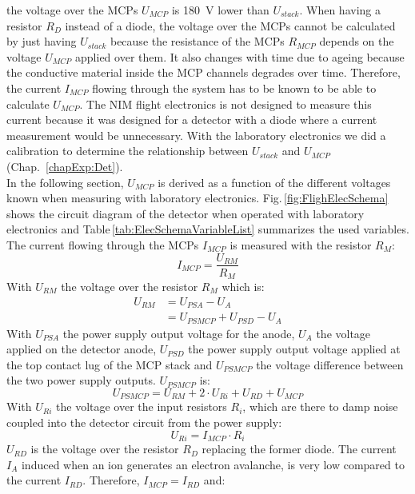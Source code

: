 the voltage over the MCPs $U_{MCP}$ is 180~V lower than $U_{stack}$. When having a resistor $R_D$ instead of a diode, the voltage over the MCPs cannot be calculated by just having $U_{stack}$ because the resistance of the MCPs $R_{MCP}$ depends on the voltage $U_{MCP}$ applied over them. It also changes with time due to ageing because the conductive material inside the MCP channels degrades over time. Therefore, the current $I_{MCP}$ flowing through the system has to be known to be able to calculate $U_{MCP}$. The NIM flight electronics is not designed to measure this current because it was designed for a detector with a diode where a current measurement would be unnecessary. With the laboratory electronics we did a calibration to determine the relationship between $U_{stack}$ and $U_{MCP}$ (Chap.~\ref{chapExp:Det}).\\
		In the following section, $U_{MCP}$ is derived as a function of the different voltages known when measuring with laboratory electronics. Fig.\,\ref{fig:FlighElecSchema} shows the circuit diagram of the detector when operated with laboratory electronics and Table\,\ref{tab:ElecSchemaVariableList} summarizes the used variables. The current flowing through the MCPs $I_{MCP}$ is measured with the resistor $R_M$:
		\begin{equation}
			I_{MCP} = \frac{U_{RM}}{R_{M}}
		\end{equation}
		With $U_{RM}$ the voltage over the resistor $R_{M}$ which is:
		\begin{align}
			U_{RM} &= U_{PSA} - U_{A}\\
				   &= U_{PSMCP} + U_{PSD} - U_A
		\end{align}
		With $U_{PSA}$ the power supply output voltage for the anode, $U_{A}$ the voltage applied on the detector anode, $U_{PSD}$ the power supply output voltage applied at the top contact lug of the MCP stack and $U_{PSMCP}$ the voltage difference between the two power supply outputs. $U_{PSMCP}$ is:
		\begin{equation}
			U_{PSMCP} = U_{RM} + 2\cdot U_{Ri} + U_{RD} + U_{MCP}
			\label{eq:UpsmcpTot}
		\end{equation}
		With $U_{Ri}$ the voltage over the input resistors $R_i$, which are there to damp noise coupled into the detector circuit from the power supply:
		\begin{equation}
			U_{Ri} = I_{MCP}\cdot R_i
		\end{equation} 
		$U_{RD}$ is the voltage over the resistor $R_D$ replacing the former diode. The current $I_A$ induced when an ion generates an electron avalanche, is very low compared to the current $I_{RD}$. Therefore, $I_{MCP} = I_{RD}$ and:
